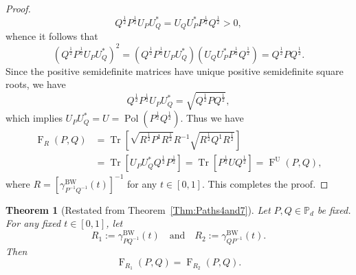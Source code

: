 \documentclass[12pt]{article}
\newtheorem{theorem}{Theorem}[section] %
\theoremstyle{definition}
\begin{document}
\begin{proof}
\begin{equation}
Q ^{\frac 12} P ^{\frac 12} U_P U_Q^* = U_Q  U_P^* P ^{\frac 12} Q ^{\frac 12}  > 0,
\end{equation}
whence it follows that
\begin{equation}
\left(Q ^{\frac 12} P ^{\frac 12} U_P U_Q^*\right)^2 = \left(Q ^{\frac 12} P ^{\frac 12} U_P U_Q^*\right) \left(U_Q  U_P^* P ^{\frac 12} Q ^{\frac 12}\right) = Q ^{\frac 12} P Q ^{\frac 12}.
\end{equation}
Since the positive semidefinite matrices have unique positive semidefinite square roots, we have
\begin{equation}
Q ^{\frac 12} P ^{\frac 12} U_P U_Q^* = \sqrt{Q ^{\frac 12} P Q ^{\frac 12}},
\end{equation}
which implies $U_P U_Q^* = U = \operatorname{Pol}\left(P ^{\frac 12} Q ^{\frac 12}\right)$. Thus we have
\begin{equation}
\begin{aligned}
    \operatorname{F}_R(P,Q) &= \operatorname{Tr}\left[\sqrt{R ^{\frac 12} P ^{1} R ^{\frac 12}} R ^{-1} \sqrt{R ^{\frac 12} Q ^{1} R ^{\frac 12}}\right] \\
&= \operatorname{Tr}\left[U_P U_Q^* Q ^{\frac 12} P ^{\frac 12}\right] = \operatorname{Tr}\left[P^{\frac 12} U Q ^{\frac 12}\right] = \operatorname{F}^\mathrm{U}(P,Q),
\end{aligned}
\end{equation}
where $R = [\gamma^{\mathrm{BW}}_{P^{-1} Q^{-1}}(t)]^{-1}$ for any $t \in [0,1]$. This completes the proof.
\end{proof}


\begin{theorembox}
\begin{theorem} [Restated from Theorem~\ref{Thm:Paths4and7}] \label{AppThm:Paths4and7}
        Let $P, Q \in \mathbb{P}_d$ be fixed. For any fixed $t \in [0,1]$, let 
        \begin{equation}
            R_1 := \gamma_{P Q^{-1}}^{\mathrm{BW}}(t) \quad \text{and} \quad R_2 := \gamma_{Q P^{-1}}^{\mathrm{BW}}(t).
        \end{equation}
        Then \begin{equation}
            \operatorname{F}_{R_1}(P,Q) = \operatorname{F}_{R_2}(P,Q).
        \end{equation} 
\end{theorem}
\end{theorembox}
\end{document}
